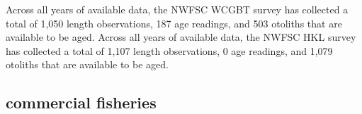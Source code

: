 \documentclass[11pt,
  english,
  letterpaper,
]{article}
\begin{document}
\leavevmode\tagmcend\tagstructend\par


Across all years of available data, the NWFSC WCGBT survey has collected a total of 1,050 length observations, 187 age readings, and 503 otoliths that are available to be aged. Across all years of available data, the NWFSC HKL survey has collected a total of 1,107 length observations, 0 age readings, and 1,079 otoliths that are available to be aged.

\leavevmode\tagmcend\tagstructend\par


\hypertarget{commercial-fisheries-14}{%
\subsection{commercial fisheries}\label{commercial-fisheries-14}}

\leavevmode\tagmcend\tagstructend


\begingroup\fontsize{10}{12}\selectfont \begingroup\fontsize{10}{12}\selectfont

\leavevmode\tagmcend\tagstructend\par
\end{document}
